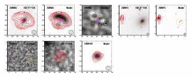 \documentclass[iop]{emulateapj}
\begin{document}
\begin{figure}[!tbp]
\begin{centering}
\includegraphics[width=0.162\textwidth]{../Figures/modelfit/XMM06_optical_bestfit.pdf}
\includegraphics[width=0.162\textwidth]{../Figures/modelfit/XMM06_model_bestfit.pdf}
\includegraphics[width=0.162\textwidth]{../Figures/modelfit/XMM06_residual_bestfit.pdf}
\includegraphics[width=0.162\textwidth]{../Figures/modelfit/XMM16_optical_bestfit.pdf}
\includegraphics[width=0.162\textwidth]{../Figures/modelfit/XMM16_model_bestfit.pdf}
\includegraphics[width=0.162\textwidth]{../Figures/modelfit/XMM16_residual_bestfit.pdf}
\includegraphics[width=0.162\textwidth]{../Figures/modelfit/XMM101_optical_bestfit.pdf}
\includegraphics[width=0.162\textwidth]{../Figures/modelfit/XMM101_model_bestfit.pdf}

\end{centering}
\end{figure}
\end{document}
